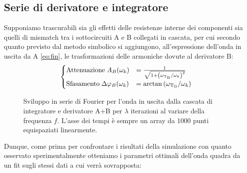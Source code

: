 \documentclass{article}[a4paper, oneside ,11pt]
\begin{document}
\subsection{Serie di derivatore e integratore}
Supponiamo trascurabili sia gli effetti delle resistenze interne dei componenti sia quelli di mismatch tra i sottocircuiti A e B collegati in cascata, per cui secondo quanto previsto dal metodo simbolico si aggiungono, all'espressione dell'onda in uscita da A \eqref{eq:fin}, le trasformazioni delle armoniche dovute al derivatore B:
\begin{align}
\begin{cases}
\mathrm{Attenuazione} \; A_B(\omega_k) &=  \frac{1}{\sqrt{1 + \left(\omega_{\rm T_B}/\omega_k \right)^2}} \\
\mathrm{Sfasamento} \; \Delta \phi_B(\omega_k) &= \arctan{\left(\omega_{\rm T_B} /\omega_k \right)} 
\end{cases}
\end{align}

\begin{figure}[!htb]
	\scalebox{0.55}{}\hfill \scalebox{0.55}{}
	\scalebox{0.55}{}\hfill \scalebox{0.55}{}
 	\caption{Sviluppo in serie di Fourier per l'onda in uscita dalla cascata di integratore e derivatore A+B per $\lambda$ iterazioni al variare della frequenza $f$. L'asse dei tempi è sempre un array da 1000 punti equispaziati linearmente. \label{plt:cas}}
\end{figure}
Dunque, come prima per confrontare i risultati della simulazione con quanto osservato sperimentalmente otteniamo i parametri ottimali dell'onda quadra da un fit sugli stessi dati a cui verrà sovrapposta:\\

\end{document}
